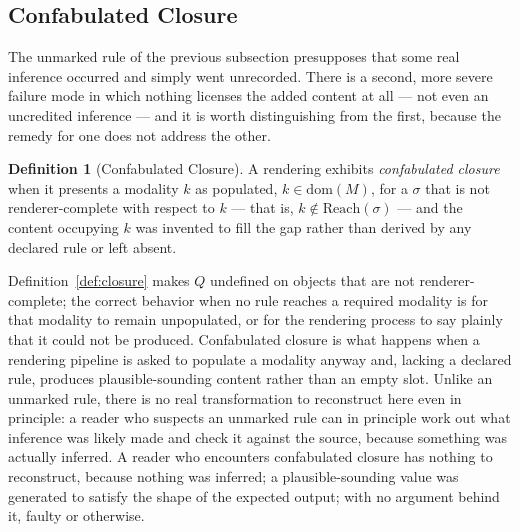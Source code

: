 \documentclass[11pt]{article}
\theoremstyle{definition}
\newtheorem{definition}[theorem]{Definition}
\begin{document}
\subsection{Confabulated Closure}
\label{sec:confabulated-closure-sec}

The unmarked rule of the previous subsection presupposes that some real inference occurred and simply went unrecorded. There is a second, more severe failure mode in which nothing licenses the added content at all --- not even an uncredited inference --- and it is worth distinguishing from the first, because the remedy for one does not address the other.

\begin{definition}[Confabulated Closure]
\label{def:confabulated-closure}
A rendering exhibits \emph{confabulated closure} when it presents a modality $k$ as populated, $k \in \mathrm{dom}(M)$, for a $\sigma$ that is not renderer-complete with respect to $k$ --- that is, $k \notin \mathrm{Reach}(\sigma)$ --- and the content occupying $k$ was invented to fill the gap rather than derived by any declared rule or left absent.
\end{definition}

Definition~\ref{def:closure} makes $Q$ undefined on objects that are not renderer-complete; the correct behavior when no rule reaches a required modality is for that modality to remain unpopulated, or for the rendering process to say plainly that it could not be produced. Confabulated closure is what happens when a rendering pipeline is asked to populate a modality anyway and, lacking a declared rule, produces plausible-sounding content rather than an empty slot. Unlike an unmarked rule, there is no real transformation to reconstruct here even in principle: a reader who suspects an unmarked rule can in principle work out what inference was likely made and check it against the source, because something was actually inferred. A reader who encounters confabulated closure has nothing to reconstruct, because nothing was inferred; a plausible-sounding value was generated to satisfy the shape of the expected output; with no argument behind it, faulty or otherwise.
\end{document}

